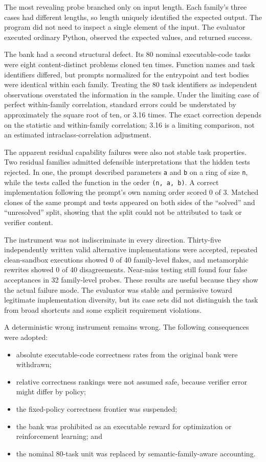 \documentclass[
  9pt,
  letterpaper,
]{article}
\providecommand{\tightlist}{%
  \setlength{\itemsep}{0pt}\setlength{\parskip}{0pt}}
\begin{document}
The most revealing probe branched only on input length. Each family's
three cases had different lengths, so length uniquely identified the
expected output. The program did not need to inspect a single element of
the input. The evaluator executed ordinary Python, observed the expected
values, and returned success.

The bank had a second structural defect. Its 80 nominal executable-code
tasks were eight content-distinct problems cloned ten times. Function
names and task identifiers differed, but prompts normalized for the
entrypoint and test bodies were identical within each family. Treating
the 80 task identifiers as independent observations overstated the
information in the sample. Under the limiting case of perfect
within-family correlation, standard errors could be understated by
approximately the square root of ten, or 3.16 times. The exact
correction depends on the statistic and within-family correlation; 3.16
is a limiting comparison, not an estimated intraclass-correlation
adjustment.

The apparent residual capability failures were also not stable task
properties. Two residual families admitted defensible interpretations
that the hidden tests rejected. In one, the prompt described parameters
\texttt{a} and \texttt{b} on a ring of size \texttt{n}, while the tests
called the function in the order \texttt{(n,\ a,\ b)}. A correct
implementation following the prompt's own naming order scored 0 of 3.
Matched clones of the same prompt and tests appeared on both sides of
the ``solved'' and ``unresolved'' split, showing that the split could
not be attributed to task or verifier content.

The instrument was not indiscriminate in every direction. Thirty-five
independently written valid alternative implementations were accepted,
repeated clean-sandbox executions showed 0 of 40 family-level flakes,
and metamorphic rewrites showed 0 of 40 disagreements. Near-miss testing
still found four false acceptances in 32 family-level probes. These
results are useful because they show the actual failure mode. The
evaluator was stable and permissive toward legitimate implementation
diversity, but its case sets did not distinguish the task from broad
shortcuts and some explicit requirement violations.

A deterministic wrong instrument remains wrong. The following
consequences were adopted:

\begin{itemize}
\tightlist
\item
  absolute executable-code correctness rates from the original bank were
  withdrawn;
\item
  relative correctness rankings were not assumed safe, because verifier
  error might differ by policy;
\item
  the fixed-policy correctness frontier was suspended;
\item
  the bank was prohibited as an executable reward for optimization or
  reinforcement learning; and
\item
  the nominal 80-task unit was replaced by semantic-family-aware
  accounting.
\end{itemize}
\end{document}
